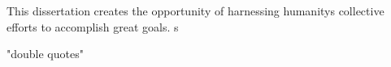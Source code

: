 This dissertation creates the opportunity of harnessing humanity\textquotesingle s collective efforts to accomplish great goals.
s


"double quotes"




